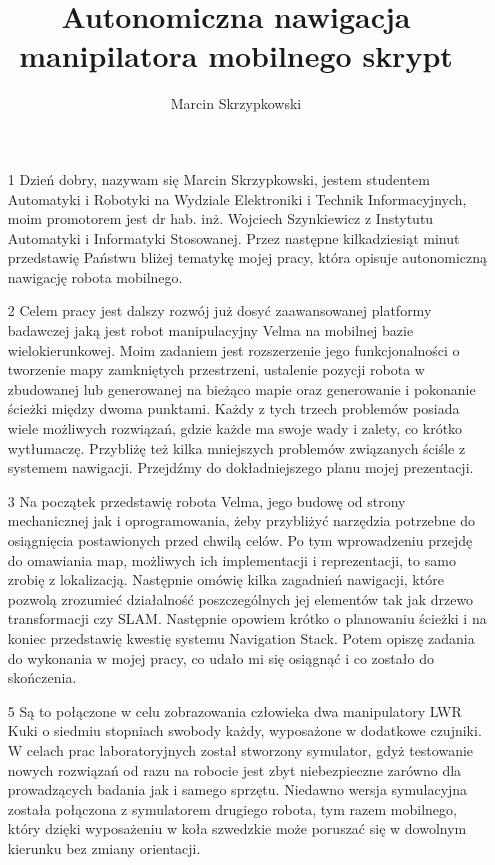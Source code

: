 \documentclass[10pt,a4paper]{article}
\author{Marcin Skrzypkowski}
\title{Autonomiczna nawigacja manipilatora mobilnego skrypt}
\begin{document}
\maketitle
\pagebreak

	\begin{itemize}
		\item [1] Dzień dobry, nazywam się Marcin Skrzypkowski, jestem studentem Automatyki i Robotyki na Wydziale Elektroniki i Technik Informacyjnych, 
moim promotorem jest dr hab. inż. Wojciech Szynkiewicz z Instytutu Automatyki i Informatyki Stosowanej. Przez następne kilkadziesiąt minut przedstawię Państwu bliżej tematykę mojej pracy, która opisuje autonomiczną nawigację robota mobilnego. 
		 \item [2]  Celem pracy jest dalszy rozwój już dosyć zaawansowanej platformy badawczej jaką jest robot manipulacyjny Velma na mobilnej bazie wielokierunkowej.     Moim zadaniem jest rozszerzenie jego funkcjonalności o tworzenie mapy zamkniętych przestrzeni, ustalenie pozycji robota w zbudowanej lub generowanej na bieżąco mapie oraz generowanie i pokonanie ścieżki między dwoma punktami.
    Każdy z tych trzech problemów posiada wiele możliwych rozwiązań, gdzie każde ma swoje wady i zalety, co krótko wytłumaczę. Przybliżę też kilka mniejszych problemów związanych ściśle z systemem nawigacji. Przejdźmy do dokładniejszego planu mojej prezentacji.
    \item[3]
    Na początek przedstawię robota Velma, jego budowę od strony mechanicznej jak i oprogramowania,
      żeby przybliżyć narzędzia potrzebne do osiągnięcia postawionych przed chwilą celów.
      Po tym wprowadzeniu przejdę do omawiania map, możliwych ich implementacji i reprezentacji,
      to samo zrobię z lokalizacją.
      Następnie omówię kilka zagadnień nawigacji, które pozwolą zrozumieć działalność poszczególnych jej elementów
      tak jak drzewo transformacji czy SLAM.
      Następnie opowiem krótko o planowaniu ścieżki i na koniec przedstawię kwestię systemu Navigation Stack.
      Potem opiszę zadania do wykonania w mojej pracy, co udało mi się osiągnąć i co zostało do skończenia.
    \item[5] 
    Są to połączone w celu zobrazowania człowieka dwa manipulatory LWR Kuki o siedmiu stopniach swobody każdy, wyposażone w dodatkowe czujniki. 
    W celach prac laboratoryjnych został stworzony symulator, gdyż testowanie nowych rozwiązań od razu na robocie jest zbyt niebezpieczne zarówno dla prowadzących badania jak i samego sprzętu.
    Niedawno wersja symulacyjna została połączona z symulatorem drugiego robota, tym razem mobilnego, który dzięki wyposażeniu w koła szwedzkie może poruszać się w dowolnym kierunku bez zmiany orientacji.

\end{itemize}
\end{document}
